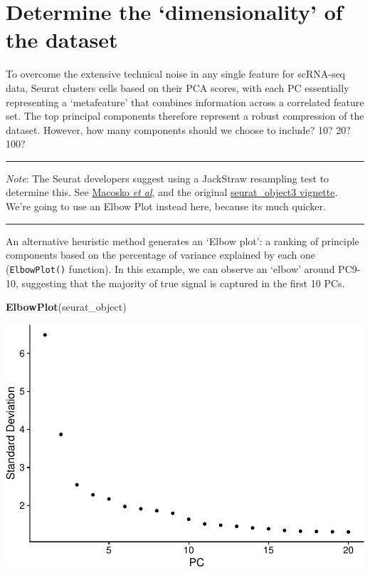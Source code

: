 \documentclass[
]{book}
\newenvironment{Shaded}{\begin{snugshade}}{\end{snugshade}}
\newcommand{\FunctionTok}[1]{\textcolor[rgb]{0.13,0.29,0.53}{\textbf{#1}}}
\newcommand{\NormalTok}[1]{#1}
\begin{document}
\hypertarget{determine-the-dimensionality-of-the-dataset}{%
\section{Determine the `dimensionality' of the dataset}\label{determine-the-dimensionality-of-the-dataset}}

To overcome the extensive technical noise in any single feature for scRNA-seq data, Seurat clusters cells based on their PCA scores, with each PC essentially representing a `metafeature' that combines information across a correlated feature set. The top principal components therefore represent a robust compression of the dataset. However, how many components should we choose to include? 10? 20? 100?

\begin{center}\rule{0.5\linewidth}{0.5pt}\end{center}

\emph{Note}: The Seurat developers suggest using a JackStraw resampling test to determine this. See \href{http://www.cell.com/abstract/S0092-8674(15)00549-8}{Macosko \emph{et al}}, and the original \href{https://satijalab.org/seurat/articles/seurat_object3k_tutorial.html\#determine-the-dimensionality-of-the-dataset-1}{seurat\_object3 vignette}. We're going to use an Elbow Plot instead here, because its much quicker.

\begin{center}\rule{0.5\linewidth}{0.5pt}\end{center}

An alternative heuristic method generates an `Elbow plot': a ranking of principle components based on the percentage of variance explained by each one (\texttt{ElbowPlot()} function). In this example, we can observe an `elbow' around PC9-10, suggesting that the majority of true signal is captured in the first 10 PCs.

\begin{Shaded}
\begin{Highlighting}[]
\FunctionTok{ElbowPlot}\NormalTok{(seurat\_object)}
\end{Highlighting}
\end{Shaded}

\includegraphics{scRNAseqInR_ABACBS_2024_Doco_files/figure-latex/elbow_plot-1.pdf}
\end{document}

